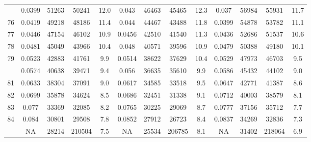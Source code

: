 \documentclass[
  14pt,
]{article}
\begin{document}
\begin{longtable}[t]{lcccccccccccc}
\addlinespace
75 & 0.0399 & 51263 & 50241 & 12.0 & 0.043 & 46463 & 45465 & 12.3 & 0.037 & 56984 & 55931 & 11.7\\
76 & 0.0419 & 49218 & 48186 & 11.4 & 0.044 & 44467 & 43488 & 11.8 & 0.0399 & 54878 & 53782 & 11.1\\
77 & 0.0446 & 47154 & 46102 & 10.9 & 0.0456 & 42510 & 41540 & 11.3 & 0.0436 & 52686 & 51537 & 10.6\\
78 & 0.0481 & 45049 & 43966 & 10.4 & 0.048 & 40571 & 39596 & 10.9 & 0.0479 & 50388 & 49180 & 10.1\\
79 & 0.0523 & 42883 & 41761 & 9.9 & 0.0514 & 38622 & 37629 & 10.4 & 0.0529 & 47973 & 46703 & 9.5\\
\addlinespace
80 & 0.0574 & 40638 & 39471 & 9.4 & 0.056 & 36635 & 35610 & 9.9 & 0.0586 & 45432 & 44102 & 9.0\\
81 & 0.0633 & 38304 & 37091 & 9.0 & 0.0617 & 34585 & 33518 & 9.5 & 0.0647 & 42771 & 41387 & 8.6\\
82 & 0.0699 & 35878 & 34624 & 8.5 & 0.0686 & 32451 & 31338 & 9.1 & 0.0712 & 40003 & 38579 & 8.1\\
83 & 0.077 & 33369 & 32085 & 8.2 & 0.0765 & 30225 & 29069 & 8.7 & 0.0777 & 37156 & 35712 & 7.7\\
84 & 0.084 & 30801 & 29508 & 7.8 & 0.0852 & 27912 & 26723 & 8.4 & 0.0837 & 34269 & 32836 & 7.3\\
\addlinespace
85 & NA & 28214 & 210504 & 7.5 & NA & 25534 & 206785 & 8.1 & NA & 31402 & 218064 & 6.9\\*
\end{longtable}
\end{document}
